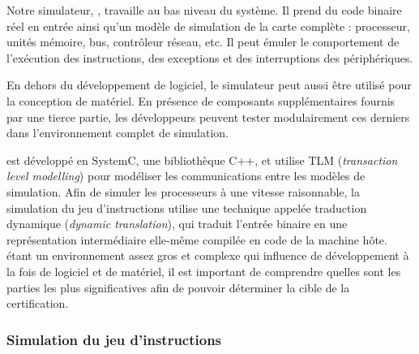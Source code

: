 Notre simulateur, \simsoc, travaille au bas niveau du système.
Il prend du code binaire réel en entrée ainsi qu'un modèle de simulation
de la carte complète : processeur, unités mémoire, bus, contrôleur réseau, etc.
Il peut émuler le comportement de l'exécution des instructions,
des exceptions et des interruptions des périphériques.

En dehors du développement de logiciel, le simulateur peut aussi être utilisé
pour la conception de matériel.
En présence de composants supplémentaires fournis par une tierce partie,
les développeurs peuvent tester modulairement ces derniers dans 
l'environnement complet de simulation.

\simsoc est développé en SystemC, une bibliothèque C++,
et utilise TLM (\emph{transaction level modelling})
pour modéliser les communications entre les modèles de simulation.
Afin de simuler les processeurs à une vitesse raisonnable, 
la simulation du jeu d'instructions utilise une technique appelée
traduction dynamique (\emph{dynamic translation}),
qui traduit l'entrée binaire en une représentation intermédiaire
elle-même compilée en code de la machine hôte.
\simsoc étant un environnement assez gros et complexe qui influence
de développement à la fois de logiciel et de matériel,
il est important de comprendre quelles sont les parties les plus
significatives afin de pouvoir déterminer la cible de la certification.

\subsubsection*{Simulation du jeu d'instructions}

